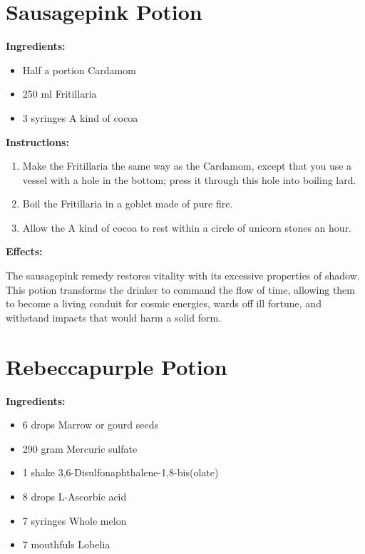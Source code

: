 \documentclass{article}
\begin{document}
\newpage
\section*{Sausagepink Potion}

\textbf{Ingredients:}

\begin{itemize}
  \item Half a portion Cardamom
  \item 250 ml Fritillaria
  \item 3 syringes A kind of cocoa
\end{itemize}

\textbf{Instructions:}

\begin{enumerate}
  \item Make the Fritillaria the same way as the Cardamom, except that you use a vessel with a hole in the bottom; press it through this hole into boiling lard.
  \item Boil the Fritillaria in a goblet made of pure fire.
  \item Allow the A kind of cocoa to rest within a circle of unicorn stones an hour.
\end{enumerate}

\textbf{Effects:}

The sausagepink remedy restores vitality with its excessive properties of shadow. This potion transforms the drinker to command the flow of time, allowing them to become a living conduit for cosmic energies, wards off ill fortune, and withstand impacts that would harm a solid form.

\newpage
\section*{Rebeccapurple Potion}

\textbf{Ingredients:}

\begin{itemize}
  \item 6 drops Marrow or gourd seeds
  \item 290 gram Mercuric sulfate
  \item 1 shake 3,6-Disulfonaphthalene-1,8-bis(olate)
  \item 8 drops L-Ascorbic acid
  \item 7 syringes Whole melon
  \item 7 mouthfuls Lobelia
\end{itemize}
\end{document}
